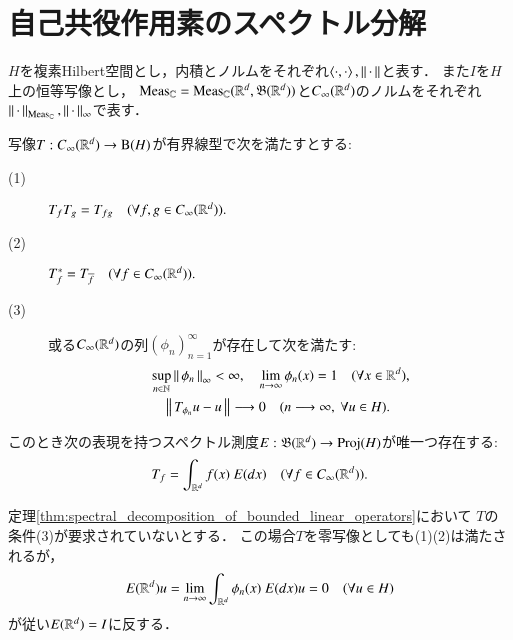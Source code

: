 \section{自己共役作用素のスペクトル分解}
	$H$を複素Hilbert空間とし，内積とノルムをそれぞれ$\inprod<\cdot,\cdot>,\Norm{\cdot}{}$と表す．
	また$I$を$H$上の恒等写像とし，
	$\mathrm{Meas}_{\mathbb{C}} = \mathrm{Meas}_{\mathbb{C}}(\mathbb{R}^d,\mathfrak{B}(\mathbb{R}^d))$と$C_\infty (\mathbb{R}^d)$のノルムをそれぞれ$\left\|\, \cdot\, \right\|_{\mathrm{Meas}_{\mathbb{C}}},\left\|\, \cdot\, \right\|_{\infty}$で表す．
	
	\begin{screen}
		\begin{thm}[スペクトル分解定理]
			写像$T:C_\infty (\mathbb{R}^d) \rightarrow \mathrm{B}(H) $が有界線型で次を満たすとする:
			\begin{description}
				\item[(1)] $T_f T_g = T_{fg} \quad (\forall f,g \in C_\infty (\mathbb{R}^d)).$
				\item[(2)] $T_f^* = T_{\overline{f}} \quad (\forall f \in C_\infty (\mathbb{R}^d)).$
				\item[(3)] 或る$C_\infty (\mathbb{R}^d)$の列$(\phi_n)_{n=1}^{\infty}$が存在して次を満たす:
					\begin{align}
						&\operatorname*{sup}_{n \in \mathbb{N}} \left\|\, \phi_n\, \right\|_{\infty} < \infty,
						\quad \lim_{n \to \infty} \phi_n(x) = 1 \quad (\forall x \in \mathbb{R}^d), \\
						&\quad \left\|\, T_{\phi_n}u - u\, \right\|_{} \longrightarrow 0
							\quad (n \longrightarrow \infty,\ \forall u \in H).
					\end{align}
			\end{description}
			このとき次の表現を持つスペクトル測度$E:\mathfrak{B}(\mathbb{R}^d) \rightarrow \mathrm{Proj}( H )$が唯一つ存在する:
			\begin{align}
				T_f = \int_{\mathbb{R}^d} f(x)\ E(dx) \quad (\forall f \in C_\infty (\mathbb{R}^d)).
			\end{align}
			\label{thm:spectral_decomposition_of_bounded_linear_operators}
		\end{thm}
	\end{screen}
	
	定理\ref{thm:spectral_decomposition_of_bounded_linear_operators}において
	$T$の条件(3)が要求されていないとする．
	この場合$T$を零写像としても(1)(2)は満たされるが，
	\begin{align}
		E(\mathbb{R}^d)u = \lim_{n \to \infty} \int_{\mathbb{R}^d} \phi_n(x)\ E(dx) u = 0 \quad (\forall u \in H)
	\end{align}
	が従い$E(\mathbb{R}^d) = I$に反する．
	
